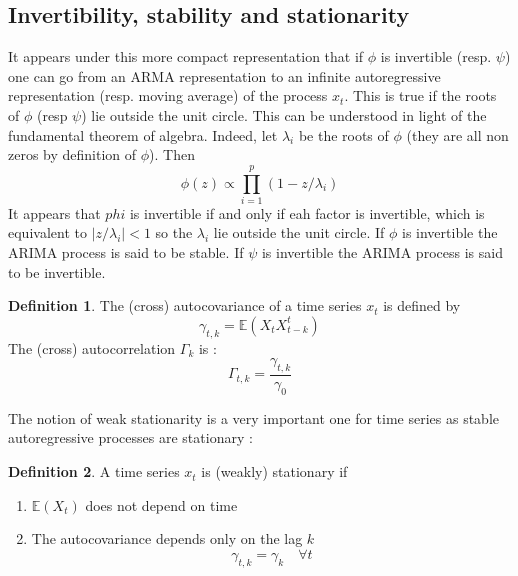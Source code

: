 \documentclass{article}
\theoremstyle{definition}
\newtheorem{Def}{Definition}[section]
\begin{document}
\subsection{Invertibility, stability and stationarity}
It appears under this more compact representation that if $\phi$ is invertible (resp. $\psi$) one can go from an ARMA representation to an infinite autoregressive representation (resp. moving average) of the process $x_t$. This is true if the roots of $\phi$ (resp $\psi$) lie outside the unit circle. This can be understood in light of the fundamental theorem of algebra. Indeed, let $\lambda_i$ be the roots of $\phi$ (they are all non zeros by definition of $\phi$). Then \begin{equation*}
    \phi(z)\propto \prod_{i=1}^{p}(1-z/\lambda_i)
\end{equation*}
It appears that $phi$ is invertible if and only if eah factor is invertible, which is equivalent to $|z/\lambda_i|<1$ so the $\lambda_i$ lie outside the unit circle. \newline 
If $\phi$ is invertible the ARIMA process is said to be stable. If $\psi$ is invertible the ARIMA process is said to be invertible.
\begin{Def}
The (cross) autocovariance of a time series $x_t$ is defined by \begin{equation*}
    \gamma_{t,k}=\mathds{E}(X_tX^{t}_{t-k})
\end{equation*}
The (cross) autocorrelation $\Gamma_k$ is : 
\begin{equation*}
    \Gamma_{t,k}=\frac{\gamma_{t,k}}{\gamma_0}
\end{equation*}
\end{Def}
The notion of weak stationarity is a very important one for time series as stable autoregressive processes are stationary : 
\begin{Def} A time series $x_t$ is (weakly) stationary if
\begin{enumerate}
    \item $\mathds{E}(X_t)$ does not depend on time
    \item The autocovariance depends only on the lag $k$
\begin{equation*}
    \gamma_{t,k}=\gamma_k\quad\forall t
\end{equation*}
\end{enumerate}
\end{Def}
\end{document}

